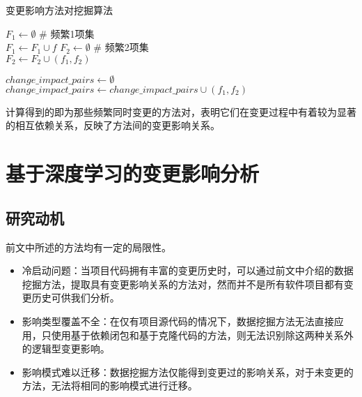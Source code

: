 \begin{algorithm}
    \caption{变更影响方法对挖掘算法}
     $F_1 \gets \emptyset$  \# 频繁1项集\\  
     {
         {
            $F_1 \gets F_1 \cup f$
        }
    } 
    $F_2 \gets \emptyset$  \# 频繁2项集\\ 
     {
         {
            $F_2 \gets F_2 \cup (f_1, f_2)$
        }
    }
    
    $change\_impact\_pairs \gets \emptyset$ \\ 
     {
         {
            $change\_impact\_pairs \gets change\_impact\_pairs \cup (f_1, f_2)$
        }
    }
    \end{algorithm}

计算得到的即为那些频繁同时变更的方法对，表明它们在变更过程中有着较为显著的相互依赖关系，反映了方法间的变更影响关系。

\section{基于深度学习的变更影响分析}
\subsection{研究动机}

前文中所述的方法均有一定的局限性。

\begin{itemize}

    \item 冷启动问题：当项目代码拥有丰富的变更历史时，可以通过前文中介绍的数据挖掘方法，提取具有变更影响关系的方法对，然而并不是所有软件项目都有变更历史可供我们分析。

    \item 影响类型覆盖不全：在仅有项目源代码的情况下，数据挖掘方法无法直接应用，只使用基于依赖闭包和基于克隆代码的方法，则无法识别除这两种关系外的逻辑型变更影响。
    
    \item 影响模式难以迁移：数据挖掘方法仅能得到变更过的影响关系，对于未变更的方法，无法将相同的影响模式进行迁移。
    
\end{itemize}

